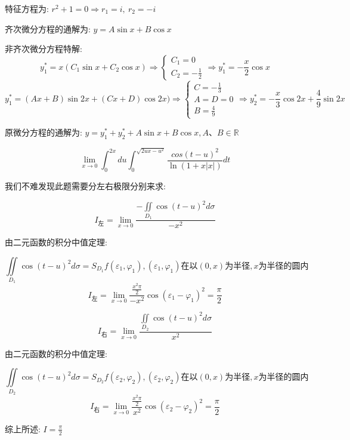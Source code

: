 \begin{solution}
	
	特征方程为: $r^2+1=0\Rightarrow r_{1}=i,\ r_{2}=-i$
	
	齐次微分方程的通解为: $y=A\sin x+B\cos x$
	
	非齐次微分方程特解: 
	$$y_{1}^{*}=x(C_{1}\sin x+C_{2}\cos x)\Rightarrow \left\lbrace 
	\begin{array}{l}
		C_{1}=0\\
		C_{2}=-\frac{1}{2}
	\end{array}
	\right. \Rightarrow y_{1}^{*}=-\frac{x}{2}\cos x$$
	$$y_{1}^{*}=(Ax+B)\sin 2x+(Cx+D)\cos 2x)\Rightarrow \left\lbrace 
	\begin{array}{l}
		C=-\frac{1}{3}\\
		A=D=0\\
		B=\frac{4}{9}
	\end{array}
	\right.\Rightarrow y_{2}^{*}=-\frac{x}{3}\cos 2x+\frac{4}{9}\sin 2x $$
	
	原微分方程的通解为: $y=y_{1}^{*}+y_{2}^{*}+A\sin x+B\cos x,A\text{、}B\in \mathbb{R}$
\end{solution}

\begin{example}[][Exam: 31.1.8]
	$$\lim\limits_{x\to 0 }\int_{0}^{2x}du\int_{0}^{\sqrt{2ux-u^2}}\dfrac{cos(t-u)^2}{\ln(1+x|x|)}dt$$
\end{example}

\begin{solution}
	
	我们不难发现此题需要分左右极限分别来求: 
	
	$$I_{\text{左}}=\lim\limits_{x\to 0 }\frac{-\iint\limits_{D_{1}}\cos(t-u)^2d\sigma}{-x^2}$$
	
	由二元函数的积分中值定理: 
	
	$$\iint\limits_{D_{1}}\cos(t-u)^2d\sigma=S_{D_{1}}f(\varepsilon_{1},\varphi_{1}),(\varepsilon_{1},\varphi_{1})\text{在以}(0,x)\text{为半径},x
	\text{为半径的圆内}$$
	$$I_{\text{左}}=\lim\limits_{x\to 0 }\frac{\frac{x^2\pi}{2}}{-x^2}\cos(\varepsilon_{1}-\varphi_{1})^2=\frac{\pi}{2}$$
	
	$$I_{\text{右}}=\lim\limits_{x\to 0 }\frac{\iint\limits_{D_{2}}\cos(t-u)^2d\sigma}{x^2}$$
	
	由二元函数的积分中值定理: 
	
	$$\iint\limits_{D_{2}}\cos(t-u)^2d\sigma=S_{D_{2}}f(\varepsilon_{2},\varphi_{2}),(\varepsilon_{2},\varphi_{2})\text{在以}(0,x)\text{为半径},x
	\text{为半径的圆内}$$
	$$I_{\text{右}}=\lim\limits_{x\to 0 }\frac{\frac{x^2\pi}{2}}{x^2}\cos(\varepsilon_{2}-\varphi_{2})^2=\frac{\pi}{2}$$
	
	综上所述: $I=\frac{\pi}{2}$
\end{solution}


